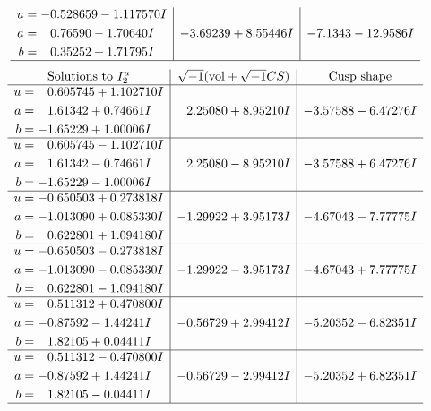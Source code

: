 \documentclass[1p]{elsarticle_modified}
\theoremstyle{definition}
\newcommand{\I}{\sqrt{-1}}
\begin{document}
$$\begin{array}{c|c|c}
\begin{aligned}
u &= -0.528659 - 1.117570 I \\
a &= \phantom{-}0.76590 - 1.70640 I \\
b &= \phantom{-}0.35252 + 1.71795 I\end{aligned}
 & -3.69239 + 8.55446 I & -7.1343 - 12.9586 I\\
 \hline 
 \end{array}$$\newpage$$\begin{array}{c|c|c}  
\text{Solutions to }I^u_{2}& \I (\text{vol} + \sqrt{-1}CS) & \text{Cusp shape}\\
 \hline 
\begin{aligned}
u &= \phantom{-}0.605745 + 1.102710 I \\
a &= \phantom{-}1.61342 + 0.74661 I \\
b &= -1.65229 + 1.00006 I\end{aligned}
 & \phantom{-}2.25080 + 8.95210 I & -3.57588 - 6.47276 I \\ \hline\begin{aligned}
u &= \phantom{-}0.605745 - 1.102710 I \\
a &= \phantom{-}1.61342 - 0.74661 I \\
b &= -1.65229 - 1.00006 I\end{aligned}
 & \phantom{-}2.25080 - 8.95210 I & -3.57588 + 6.47276 I \\ \hline\begin{aligned}
u &= -0.650503 + 0.273818 I \\
a &= -1.013090 + 0.085330 I \\
b &= \phantom{-}0.622801 + 1.094180 I\end{aligned}
 & -1.29922 + 3.95173 I & -4.67043 - 7.77775 I \\ \hline\begin{aligned}
u &= -0.650503 - 0.273818 I \\
a &= -1.013090 - 0.085330 I \\
b &= \phantom{-}0.622801 - 1.094180 I\end{aligned}
 & -1.29922 - 3.95173 I & -4.67043 + 7.77775 I \\ \hline\begin{aligned}
u &= \phantom{-}0.511312 + 0.470800 I \\
a &= -0.87592 - 1.44241 I \\
b &= \phantom{-}1.82105 + 0.04411 I\end{aligned}
 & -0.56729 + 2.99412 I & -5.20352 - 6.82351 I \\ \hline\begin{aligned}
u &= \phantom{-}0.511312 - 0.470800 I \\
a &= -0.87592 + 1.44241 I \\
b &= \phantom{-}1.82105 - 0.04411 I\end{aligned}
 & -0.56729 - 2.99412 I & -5.20352 + 6.82351 I\\
 \hline 
 \end{array}$$\newpage
\end{document}
